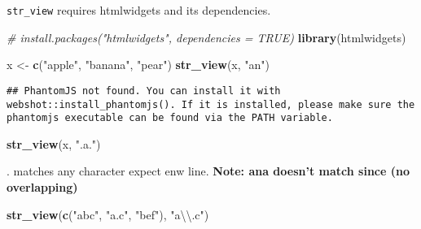 \documentclass[
]{article}
\newenvironment{Shaded}{\begin{snugshade}}{\end{snugshade}}
\newcommand{\CharTok}[1]{\textcolor[rgb]{0.31,0.60,0.02}{#1}}
\newcommand{\CommentTok}[1]{\textcolor[rgb]{0.56,0.35,0.01}{\textit{#1}}}
\newcommand{\KeywordTok}[1]{\textcolor[rgb]{0.13,0.29,0.53}{\textbf{#1}}}
\newcommand{\NormalTok}[1]{#1}
\newcommand{\StringTok}[1]{\textcolor[rgb]{0.31,0.60,0.02}{#1}}
\begin{document}
\texttt{str\_view} requires htmlwidgets and its dependencies.

\begin{Shaded}
\begin{Highlighting}[]
\CommentTok{\# install.packages("htmlwidgets", dependencies = TRUE)}
\KeywordTok{library}\NormalTok{(htmlwidgets)}
\end{Highlighting}
\end{Shaded}

\begin{Shaded}
\begin{Highlighting}[]
\NormalTok{x \textless{}{-}}\StringTok{ }\KeywordTok{c}\NormalTok{(}\StringTok{"apple"}\NormalTok{, }\StringTok{"banana"}\NormalTok{, }\StringTok{"pear"}\NormalTok{)}
\KeywordTok{str\_view}\NormalTok{(x, }\StringTok{"an"}\NormalTok{)}
\end{Highlighting}
\end{Shaded}

\begin{verbatim}
## PhantomJS not found. You can install it with webshot::install_phantomjs(). If it is installed, please make sure the phantomjs executable can be found via the PATH variable.
\end{verbatim}

\hypertarget{htmlwidget-55856640de0d870821f7}{}
\begin{str_view}

\end{str_view}

\begin{Shaded}
\begin{Highlighting}[]
\KeywordTok{str\_view}\NormalTok{(x, }\StringTok{".a."}\NormalTok{)}
\end{Highlighting}
\end{Shaded}

\hypertarget{htmlwidget-6c6d16a1c4653efe3c3a}{}
\begin{str_view}

\end{str_view}

. matches any character expect enw line. \textbf{Note: ana doesn't match
since (no overlapping)}

\begin{Shaded}
\begin{Highlighting}[]
\KeywordTok{str\_view}\NormalTok{(}\KeywordTok{c}\NormalTok{(}\StringTok{"abc"}\NormalTok{, }\StringTok{"a.c"}\NormalTok{, }\StringTok{"bef"}\NormalTok{), }\StringTok{"a}\CharTok{\textbackslash{}\textbackslash{}}\StringTok{.c"}\NormalTok{)}
\end{Highlighting}
\end{Shaded}
\end{document}
